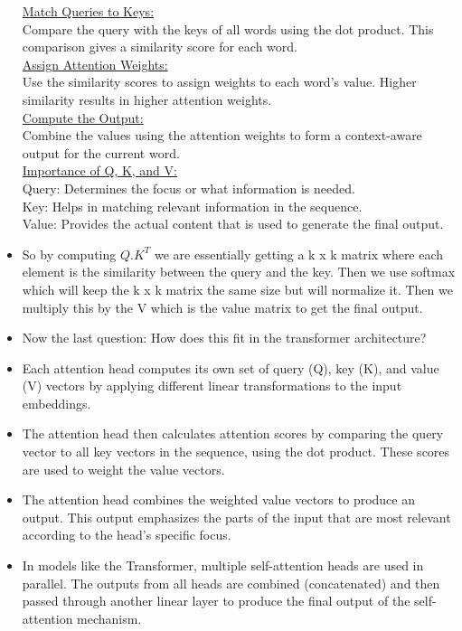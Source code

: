 \documentclass{article}
\begin{document}
\begin{itemize}
    \underline{Match Queries to Keys:} \\
    Compare the query with the keys of all words using the dot product. This comparison gives a similarity score for each word.\\
    \underline{Assign Attention Weights:} \\
    Use the similarity scores to assign weights to each word’s value. Higher similarity results in higher attention weights. \\ 
    \underline{Compute the Output:} \\ 
    Combine the values using the attention weights to form a context-aware output for the current word. \\
    \underline{Importance of Q, K, and V:} \\ 
    Query: Determines the focus or what information is needed.\\ 
    Key: Helps in matching relevant information in the sequence.\\ 
    Value: Provides the actual content that is used to generate the final output. \\ 
    \item So by computing $Q.K^T$ we are essentially getting a  k x k matrix where each element is the similarity between the query and the key. Then we use softmax which will keep the k x k matrix the same size but will normalize it. Then we multiply this by the V which is the value matrix to get the final output.
    \item Now the last question: How does this fit in the transformer architecture?
    \item Each attention head computes its own set of query (Q), key (K), and value (V) vectors by applying different linear transformations to the input embeddings.
    \item The attention head then calculates attention scores by comparing the query vector to all key vectors in the sequence, using the dot product. These scores are used to weight the value vectors.
    \item The attention head combines the weighted value vectors to produce an output. This output emphasizes the parts of the input that are most relevant according to the head’s specific focus. 
    \item In models like the Transformer, multiple self-attention heads are used in parallel. The outputs from all heads are combined (concatenated) and then passed through another linear layer to produce the final output of the self-attention mechanism.

\end{itemize}
\end{document}
